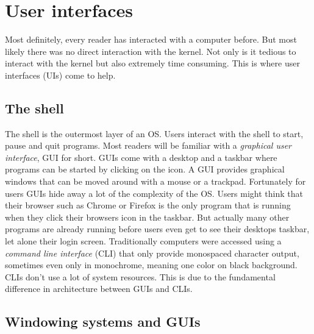 \section{User interfaces}

Most definitely, every reader has interacted with a computer before. But most likely there was no
direct interaction with the kernel. Not only is it tedious to interact with the kernel but also
extremely time consuming. This is where user interfaces (UIs) come to help.

\subsection{The shell}

The shell is the outermost layer of an OS. Users interact with the shell to start, pause and quit
programs. Most readers will be familiar with a \textit{graphical user interface}, GUI for short. GUIs come
with a desktop and a taskbar where programs can be started by clicking on the icon. A GUI provides
graphical windows that can be moved around with a mouse or a trackpad. Fortunately for users GUIs
hide away a lot of the complexity of the OS. Users might think that their browser such as Chrome or
Firefox is the only program that is running when they click their browsers icon in the taskbar. But
actually many other programs are already running before users even get to see their desktops taskbar,
let alone their login screen. Traditionally computers were accessed using a \textit{command line interface}
(CLI) that only provide monospaced character output, sometimes even only in monochrome, meaning one
color on black background. CLIs don't use a lot of system resources. This is due to the fundamental
difference in architecture between GUIs and CLIs.

\subsection{Windowing systems and GUIs}

